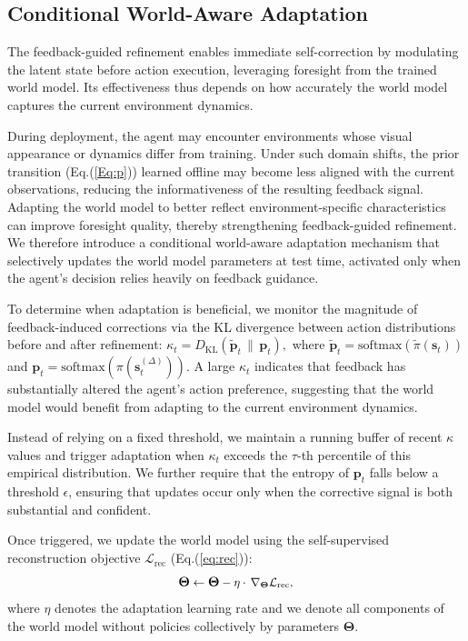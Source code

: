\documentclass{article}
\theoremstyle{plain}
\theoremstyle{definition}
\theoremstyle{remark}
\begin{document}
\subsection{Conditional World-Aware Adaptation}
\label{sec:world_adaptation}
The feedback-guided refinement enables immediate self-correction by modulating the latent state before action execution, leveraging foresight from the trained world model. Its effectiveness thus depends on how accurately the world model captures the current environment dynamics.



During deployment, the agent may encounter environments whose visual appearance or dynamics differ from training.
Under such domain shifts, the prior transition (Eq.(\ref{Eq:p})) learned offline may become less aligned with the current observations, reducing the informativeness of the resulting feedback signal.
Adapting the world model to better reflect environment-specific characteristics can improve foresight quality, thereby strengthening feedback-guided refinement.
We therefore introduce a conditional world-aware adaptation mechanism that selectively updates the world model parameters at test time, activated only when the agent's decision relies heavily on feedback guidance.


To determine when adaptation is beneficial, we monitor the magnitude of feedback-induced corrections via the KL divergence between action distributions before and after refinement:
$\kappa_t = D_{\mathrm{KL}}\!\left(\tilde{\boldsymbol{p}}_t \,\|\, \boldsymbol{p}_t\right),$
where $\tilde{\boldsymbol{p}}_t = \mathrm{softmax}(\tilde{\pi}(\boldsymbol{s}_t))$ and $\boldsymbol{p}_t = \mathrm{softmax}(\pi(\boldsymbol{s}_t^{(\Delta)}))$.
A large $\kappa_t$ indicates that feedback has substantially altered the agent’s action preference, suggesting that the world model would benefit from adapting to the current environment dynamics.



Instead of relying on a fixed threshold, we maintain a running buffer of recent $\kappa$ values and trigger adaptation when $\kappa_t$ exceeds the $\tau$-th percentile of this empirical distribution.
We further require that the entropy of $\boldsymbol{p}_t$ falls below a threshold $\epsilon$, ensuring that updates occur only when the corrective signal is both substantial and confident.


Once triggered, we update the world model using the self-supervised reconstruction objective $\mathcal{L}_{\mathrm{rec}}$ (Eq.(\ref{eq:rec})): 
\begin{equation}\label{eq:grad}
\boldsymbol{\Theta} \leftarrow \boldsymbol{\Theta} - \eta \cdot \,\nabla_{\small \boldsymbol{\Theta}} \mathcal{L}_{\mathrm{rec}},
\end{equation}
where $\eta$ denotes the adaptation learning rate and we denote all components of the world model without policies collectively by parameters $\boldsymbol{\Theta}$.
\end{document}
